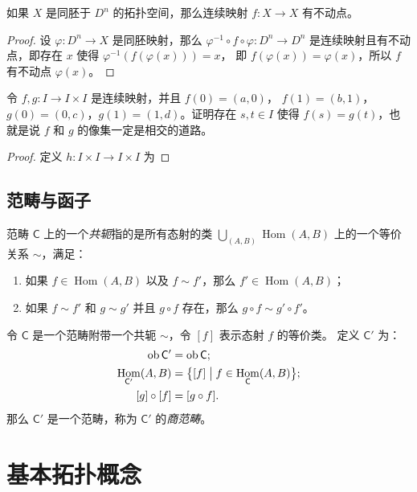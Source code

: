 \documentclass[fontset=none]{Notes}
\DeclareMathOperator\Hom{Hom}
\DeclareMathOperator\ob{ob}
\newcommand{\cat}[1]{\mathsf{#1}}
\begin{document}
\begin{problem}{}{}
  如果 $X$ 是同胚于 $D^n$ 的拓扑空间，那么连续映射
  $f:X\to X$ 有不动点。
\end{problem} 
\begin{proof}
  设 $\varphi:D^n\to X$ 是同胚映射，那么 $\varphi^{-1}\circ f\circ\varphi:D^n\to D^n$
  是连续映射且有不动点，即存在 $x$ 使得 $\varphi^{-1}(f(\varphi(x)))=x$，
  即 $f(\varphi(x))=\varphi(x)$，所以 $f$ 有不动点 $\varphi(x)$。
\end{proof}

\begin{problem}{}{}
  令 $f,g:I\to I\times I$ 是连续映射，并且 $f(0)=(a,0)$，
  $f(1)=(b,1)$，$g(0)=(0,c)$，$g(1)=(1,d)$。证明存在 $s,t\in I$
  使得 $f(s)=g(t)$，也就是说 $f$ 和 $g$ 的像集一定是相交的道路。
\end{problem}
\begin{proof}
  定义 $h:I\times I\to I\times I$ 为
\end{proof}


\section{范畴与函子}

\begin{definition}
  范畴 $\cat C$ 上的一个\emph{共轭}指的是所有态射的类 $\bigcup_{(A,B)}\Hom(A,B)$
  上的一个等价关系 $\sim$，满足：
  \begin{enumerate}
    \item 如果 $f\in\Hom(A,B)$ 以及 $f\sim f'$，那么 $f'\in\Hom(A,B)$；
    \item 如果 $f\sim f'$ 和 $g\sim g'$ 并且 $g\circ f$ 存在，那么
    $g\circ f\sim g'\circ f'$。
  \end{enumerate}
\end{definition}

\begin{theorem}
  令 $\cat C$ 是一个范畴附带一个共轭 $\sim$，令 $[f]$ 表示态射 $f$ 的等价类。
  定义 $\cat C'$ 为：
  \begin{align*}
    \ob \cat C'&=\ob \cat C;\\
    \Hom_{\cat C'}(A,B)&=\bigl\{[f]\bigm| f\in\Hom_{\cat C}(A,B)\bigr\};\\
    [g]\circ [f]&=[g\circ f].
  \end{align*}
  那么 $\cat C'$ 是一个范畴，称为 $\cat C'$ 的\emph{商范畴}。
\end{theorem}

\chapter{基本拓扑概念}
\end{document}

